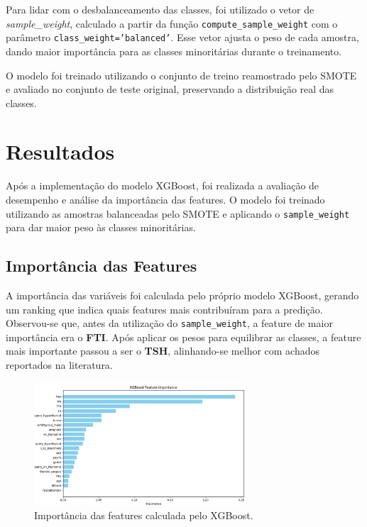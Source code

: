 \documentclass[11pt]{article}
\begin{document}
Para lidar com o desbalanceamento das classes, foi utilizado o vetor de \textit{sample\_weight}, calculado a partir da função \texttt{compute\_sample\_weight} com o parâmetro \texttt{class\_weight='balanced'}. Esse vetor ajusta o peso de cada amostra, dando maior importância para as classes minoritárias durante o treinamento.

O modelo foi treinado utilizando o conjunto de treino reamostrado pelo SMOTE e avaliado no conjunto de teste original, preservando a distribuição real das classes.  

\section{Resultados}

Após a implementação do modelo XGBoost, foi realizada a avaliação de desempenho e análise da importância das features. O modelo foi treinado utilizando as amostras balanceadas pelo SMOTE e aplicando o \texttt{sample\_weight} para dar maior peso às classes minoritárias.

\subsection{Importância das Features}

A importância das variáveis foi calculada pelo próprio modelo XGBoost, gerando um ranking que indica quais features mais contribuíram para a predição. Observou-se que, antes da utilização do \texttt{sample\_weight}, a feature de maior importância era o \textbf{FTI}. Após aplicar os pesos para equilibrar as classes, a feature mais importante passou a ser o \textbf{TSH}, alinhando-se melhor com achados reportados na literatura.

\begin{figure}[H]
    \centering
    \includegraphics[width=0.7\textwidth]{img/feature_importance.png}
    \caption{Importância das features calculada pelo XGBoost.}
    \label{fig:feature_importance}
\end{figure}
\end{document}
